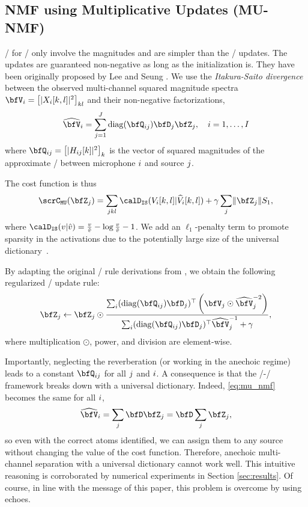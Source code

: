 \subsection{NMF using Multiplicative Updates (MU-NMF)}\label{sec:separake:mu}

\MUdef/ for \NMF/ only involve the magnitudes and are simpler than the \EM/ updates.
The updates are guaranteed non-negative as long as the initialization is.
They have been originally proposed by Lee and Seung .
We use the \textit{Itakura-Saito divergence}  between the observed multi-channel squared magnitude spectra $\mV_\idxMic = \klist{\powerOf{\MIC_\idxMic[k,l]}}_{kl}$ and their non-negative factorizations,
\begin{equation}
    \label{eq:mu_nmf}
    \wh{\mV}_\idxMic = \sum_{\idxSrc=1}^{\numSrcs} \diag(\vQ_{\idxMicSrc}) \mD_\idxSrc \mZ_\idxSrc , \quad \idxMic=1,\ldots,\numMics
\end{equation}
where $\vQ_{\idxMicSrc} = \klist{\powerOf{H_{\idxMicSrc}[k]}}_k$ is the vector of squared magnitudes of the approximate \RTF/ between microphone $i$ and source $j$.

\mynewline
The cost function is thus
\begin{equation}
    \scrC_{\mathtt{MU}}(\mZ_\idxSrc) = \sum_{\idxSrc k l} \calD_{\mathtt{IS}}(V_{\idxMic}[k,l] | \wh{V}_{\idxMic}[k,l])
    + \gamma \sum_\idxSrc \kvvbar{\mZ_\idxSrc}S_1,
\end{equation}
where $\calD_{\mathtt{IS}}( v | \hat{v} ) = \frac{v}{\hat{v}} - \log \frac{v}{\hat{v}} - 1$.
We add an $\ell_1$-penalty term to promote sparsity in the activations due to the potentially large size of the universal dictionary~.

\mynewline
By adapting the original \MU/ rule derivations from \citeauthor{ozerov2010multichannel}, we obtain the following regularized \MU/ update rule:
\begin{align}
    \mZ_\idxSrc \gets \mZ_\idxSrc \odot \frac{\sum_\idxMic (\diag(\vQ_{ij}) \mD_\idxSrc)^\top \left(\mV_\idxSrc \odot \wh{\mV}_\idxSrc^{-2}\right)}{\sum_\idxMic(\diag(\vQ_{ij}) \mD_\idxSrc)^\top \wh{\mV}_\idxSrc^{-1} + \gamma},
\end{align}
where multiplication $\odot$, power, and division are element-wise.

\mynewline
Importantly, neglecting the reverberation (or working in the anechoic regime) leads to a constant $\vQ_{\idxMicSrc}$ for all $j$ and $i$.
A consequence is that the \MU/-\NMF/ framework breaks down with a universal dictionary.
Indeed, \eqref{eq:mu_nmf} becomes the same for all $i$,
\begin{equation*}
    \wh{\mV}_\idxMic = \sum_{\idxSrc} \mD \mZ_\idxSrc = \mD \sum_\idxSrc \mZ_\idxSrc,
\end{equation*}
so even with the correct atoms identified, we can assign them to any source without changing
the value of the cost function. Therefore, anechoic multi-channel separation with a universal dictionary cannot work well.
This intuitive reasoning is corroborated by numerical experiments in Section \ref{sec:results}.
Of course, in line with the message of this paper, this problem is overcome by using echoes.

